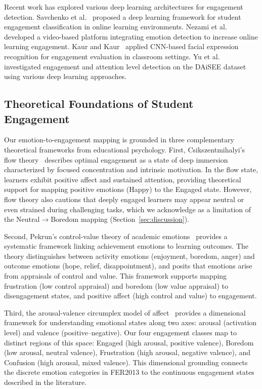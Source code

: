 \documentclass[sensors,article,submit,pdftex,moreauthors]{Definitions/mdpi}
\begin{document}
Recent work has explored various deep learning architectures for engagement detection. Savchenko et al.~\cite{savchenko2022emotions} proposed a deep learning framework for student engagement classification in online learning environments. Nezami et al.~\cite{nezami2020automatic} developed a video-based platform integrating emotion detection to increase online learning engagement. Kaur and Kaur~\cite{kaur2022review} applied CNN-based facial expression recognition for engagement evaluation in classroom settings. Yu et al.~\cite{yu2024bridging} investigated engagement and attention level detection on the DAiSEE dataset using various deep learning approaches.

\subsection{Theoretical Foundations of Student Engagement}
\label{sec:theory}

Our emotion-to-engagement mapping is grounded in three complementary theoretical frameworks from educational psychology. First, Csikszentmihalyi's flow theory~\cite{csikszentmihalyi1990flow} describes optimal engagement as a state of deep immersion characterized by focused concentration and intrinsic motivation. In the flow state, learners exhibit positive affect and sustained attention, providing theoretical support for mapping positive emotions (Happy) to the Engaged state. However, flow theory also cautions that deeply engaged learners may appear neutral or even strained during challenging tasks, which we acknowledge as a limitation of the Neutral$\rightarrow$Boredom mapping (Section~\ref{sec:discussion}).

Second, Pekrun's control-value theory of academic emotions~\cite{pekrun2002academic} provides a systematic framework linking achievement emotions to learning outcomes. The theory distinguishes between activity emotions (enjoyment, boredom, anger) and outcome emotions (hope, relief, disappointment), and posits that emotions arise from appraisals of control and value. This framework supports mapping frustration (low control appraisal) and boredom (low value appraisal) to disengagement states, and positive affect (high control and value) to engagement.

Third, the arousal-valence circumplex model of affect~\cite{russell1980circumplex} provides a dimensional framework for understanding emotional states along two axes: arousal (activation level) and valence (positive--negative). Our four engagement classes map to distinct regions of this space: Engaged (high arousal, positive valence), Boredom (low arousal, neutral valence), Frustration (high arousal, negative valence), and Confusion (high arousal, mixed valence). This dimensional grounding connects the discrete emotion categories in FER2013 to the continuous engagement states described in the literature.
\end{document}
